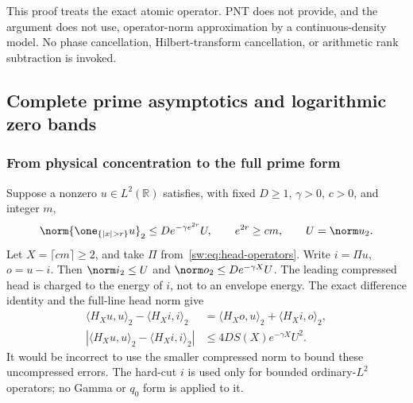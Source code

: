 \documentclass[11pt,a4paper]{article}
\numberwithin{equation}{section}
\theoremstyle{definition}\newtheorem{definition}[theorem]{Definition}
\theoremstyle{remark}\newtheorem{remark}[theorem]{Remark}
\begin{document}
This proof treats the exact atomic operator. PNT does not provide, and the argument does not use, operator-norm approximation by a continuous-density model. No phase cancellation, Hilbert-transform cancellation, or arithmetic rank subtraction is invoked.

\subsection{Complete prime asymptotics and logarithmic zero bands}\label{sw:sec:pnt-bands}
\subsubsection{From physical concentration to the full prime form}
Suppose a nonzero $u\in L^2(\mathbb R)$ satisfies, with fixed $D\ge1$, $\gamma>0$, $c>0$, and integer $m$,
\begin{equation}\label{sw:eq:abstract-tail}
 \norm{\one_{\{|x|>r\}}u}_2\le D e^{-\gamma e^{2r}}U,
 \qquad e^{2r}\ge cm,\qquad U=\norm u_2.
\end{equation}
Let $X=\lceil cm\rceil\ge2$, and take $\Pi$ from~\eqref{sw:eq:head-operators}. Write $i=\Pi u$, $o=u-i$. Then $\norm i_2\le U$ and $\norm o_2\le De^{-\gamma X}U$. The leading compressed head is charged to the energy of $i$, not to an envelope energy. The exact difference identity and the full-line head norm give
\begin{align*}
 \langle H_Xu,u\rangle_2-\langle H_Xi,i\rangle_2
 &=\langle H_Xo,u\rangle_2+\langle H_Xi,o\rangle_2,\\
 |\langle H_Xu,u\rangle_2-\langle H_Xi,i\rangle_2|
 &\le4D S(X)e^{-\gamma X}U^2.
\end{align*}
It would be incorrect to use the smaller compressed norm to bound these uncompressed errors. The hard-cut $i$ is used only for bounded ordinary-$L^2$ operators; no Gamma or $q_0$ form is applied to it.
\end{document}
